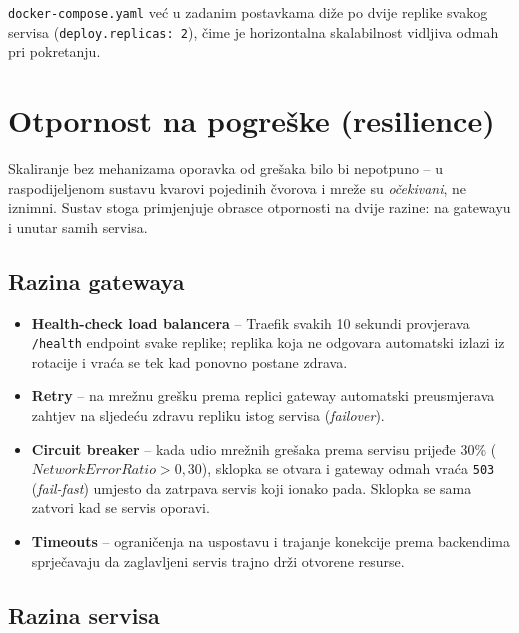 \documentclass[12pt,a4paper]{article}
\begin{document}
\texttt{docker-compose.yaml} već u zadanim postavkama diže po dvije replike svakog servisa (\texttt{deploy.replicas: 2}), čime je horizontalna skalabilnost vidljiva odmah pri pokretanju.

\section{Otpornost na pogreške (resilience)}

Skaliranje bez mehanizama oporavka od grešaka bilo bi nepotpuno -- u raspodijeljenom sustavu kvarovi pojedinih čvorova i mreže su \emph{očekivani}, ne iznimni. Sustav stoga primjenjuje obrasce otpornosti na dvije razine: na gatewayu i unutar samih servisa.

\subsection{Razina gatewaya}

\begin{itemize}
  \item \textbf{Health-check load balancera} -- Traefik svakih 10 sekundi provjerava \texttt{/health} endpoint svake replike; replika koja ne odgovara automatski izlazi iz rotacije i vraća se tek kad ponovno postane zdrava.
  \item \textbf{Retry} -- na mrežnu grešku prema replici gateway automatski preusmjerava zahtjev na sljedeću zdravu repliku istog servisa (\emph{failover}).
  \item \textbf{Circuit breaker} -- kada udio mrežnih grešaka prema servisu prijeđe 30\% ($\mathit{NetworkErrorRatio} > 0{,}30$), sklopka se otvara i gateway odmah vraća \texttt{503} (\emph{fail-fast}) umjesto da zatrpava servis koji ionako pada. Sklopka se sama zatvori kad se servis oporavi.
  \item \textbf{Timeouts} -- ograničenja na uspostavu i trajanje konekcije prema backendima sprječavaju da zaglavljeni servis trajno drži otvorene resurse.
\end{itemize}

\subsection{Razina servisa}
\end{document}
